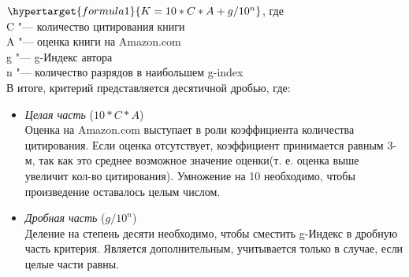 \documentclass{article}
\begin{document}
			$ \hypertarget{formula1}{K = 10 * C * A + g / 10^n} $, где \\
			C  "---  количество цитирования книги \\
			A  "---  оценка книги на Amazon.com\\
			g "--- g-Индекс автора\\
			n "--- количество разрядов в наибольшем g-index \\			
			В итоге, критерий представляется десятичной дробью, где: 
				\begin{itemize}
					\item \textit{Целая часть} ($10*C*A$)\\
						Оценка на Amazon.com выступает в роли коэффициента количества цитирования. Если оценка отсутствует, коэффициент принимается равным 3-м, так как это среднее возможное значение оценки(т. е. оценка выше увеличит кол-во цитирования). Умножение на 10 необходимо, чтобы произведение оставалось целым числом.
					\item \textit{Дробная часть} ($g / 10^n$)\\
						Деление на степень десяти необходимо, чтобы сместить g-Индекс в дробную часть критерия. Является дополнительным, учитывается только в случае, если целые части равны.
				\end{itemize}
\newpage
\end{document}
